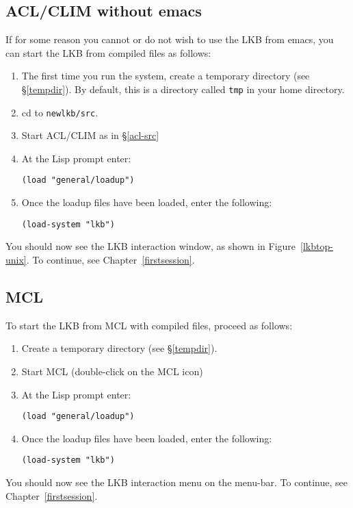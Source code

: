 \documentclass[12pt]{report}
\begin{document}
\subsection{ACL/CLIM without emacs}
\label{acl-comp}

If for some reason you cannot or do not wish to use
the LKB from emacs, you can start the LKB from compiled files as follows:
\begin{enumerate}
\item The first time you run the system,
create a temporary directory (see \S\ref{tempdir}).  By default, this is
a directory called {\tt tmp} in your home directory.
\item cd to \verb+newlkb/src+.  
\item Start ACL/CLIM as in \S\ref{acl-src}
\item At the Lisp prompt enter:
\begin{verbatim}
(load "general/loadup") 
\end{verbatim}
\item Once the loadup files have been loaded, enter the following:
\begin{verbatim}
(load-system "lkb")
\end{verbatim}
\end{enumerate}
You
should now see the LKB interaction window, as shown in 
Figure~\ref{lkbtop-unix}.
To continue, see Chapter~\ref{firstsession}.

\subsection{MCL}
\label{mcl-comp}

To start the LKB from MCL with compiled files, proceed as follows:
\begin{enumerate}
\item Create a temporary directory (see \S\ref{tempdir}).
\item Start MCL (double-click on the MCL icon)
\item At the Lisp prompt enter:
\begin{verbatim}
(load "general/loadup") 
\end{verbatim}
\item Once the loadup files have been loaded, enter the following:
\begin{verbatim}
(load-system "lkb")
\end{verbatim}
\end{enumerate}
You
should now see the LKB interaction menu on the menu-bar.
To continue, see Chapter~\ref{firstsession}.
\end{document}
